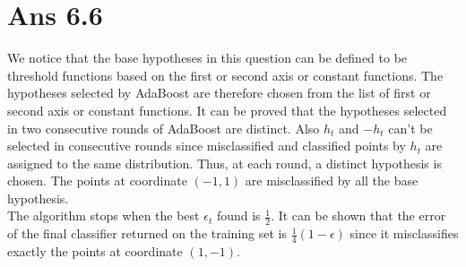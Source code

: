 \documentclass[10pt]{article}
\begin{document}
\section*{Ans 6.6}
\begin{flushleft}
We notice that the base hypotheses in this question can be defined to be threshold functions based on the first or second axis or constant functions. The hypotheses selected by AdaBoost are therefore chosen from the list of first or second axis or constant functions. It can be proved that the hypotheses selected in two consecutive rounds of AdaBoost are distinct. Also $h_{t}$ and $-h_{t}$ can't be selected in consecutive rounds since misclassified and classified points by $h_{t}$ are assigned to the same distribution. Thus, at each round, a distinct hypothesis is chosen. The points at coordinate $(-1, 1)$ are misclassified by all the base hypothesis.\\
\vspace{0.5em}
The algorithm stops when the best $\epsilon_{t}$ found is $\frac{1}{2}$. It can be shown that the error of the final classifier returned on the training set is $\frac{1}{4} (1- \epsilon)$ since it misclassifies exactly the points at coordinate $(1, -1)$.
\end{flushleft}
\end{document}
